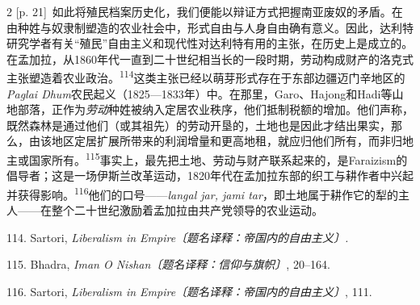 \documentclass[10pt,a4paper]{article}
\begin{document}
\begin{paracol}{2}
{\scriptsize\color{gray} [p. 21]}\ 如此将殖民档案历史化，我们便能以辩证方式把握南亚废奴的矛盾。在由种姓与奴隶制塑造的农业社会中，形式自由与人身自由确有意义。因此，达利特研究学者有关“殖民”自由主义和现代性对达利特有用的主张，在历史上是成立的。在孟加拉，从1860年代一直到二十世纪相当长的一段时期，劳动构成财产的洛克式主张塑造着农业政\mbox{治。\textsuperscript{114}}这类主张已经以萌芽形式存在于东部边疆迈门辛地区的\textit{Paglai Dhum}农民起义（1825—1833年）中。在那里，Garo、Hajong和Hadi等山地部落，正作为\textit{劳动}种姓被纳入定居农业秩序，他们抵制税额的增加。他们声称，既然森林是通过他们（或其祖先）的劳动开垦的，土地也是因此才结出果实，那么，由该地区定居扩展所带来的利润增量和更高地租，就应归他们所有，而非归地主或国家所\mbox{有。\textsuperscript{115}}事实上，最先把土地、劳动与财产联系起来的，是Faraizism的倡导者；这是一场伊斯兰改革运动，1820年代在孟加拉东部的织工与耕作者中兴起并获得影\mbox{响。\textsuperscript{116}}他们的口号——\textit{langal jar, jami tar}，即土地属于耕作它的犁的主人——在整个二十世纪激励着孟加拉由共产党领导的农业运动。\par{\small 114. Sartori, \textit{Liberalism in Empire〔题名译释：帝国内的自由主义〕.}\par}{\small 115. Bhadra, \textit{Iman O Nishan〔题名译释：信仰与旗帜〕}, 20–164.\par}{\small 116. Sartori, \textit{Liberalism in Empire〔题名译释：帝国内的自由主义〕}, 111.\par}
\switchcolumn

\end{paracol}
\end{document}
